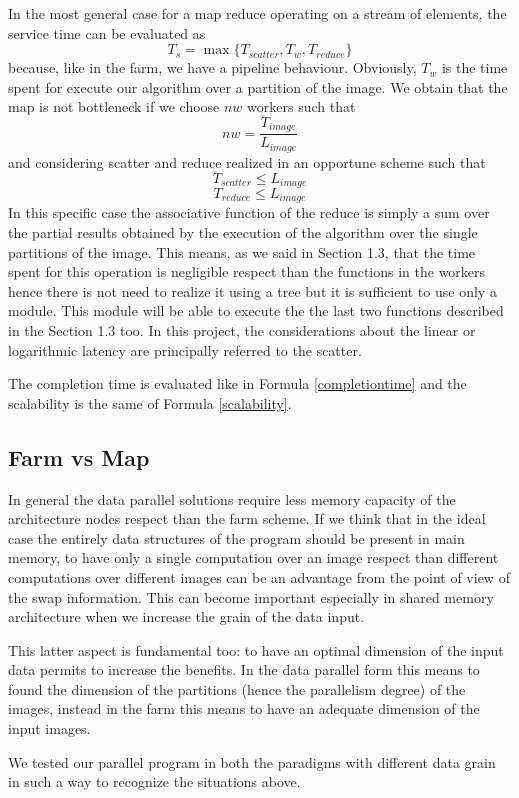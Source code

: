 In the most general case for a map reduce operating on a stream of elements, the service time can be evaluated as
\[
T_{s} = \max\lbrace T_{scatter}, T_{w}, T_{reduce}\rbrace
\]
because, like in the farm, we have a pipeline behaviour. Obviously, $T_{w}$ is the time spent for execute our algorithm over a partition of the image. We obtain that the map is not bottleneck if we choose $nw$ workers such that
\[
nw = \frac{T_{image}}{L_{image}}
\]
and considering scatter and reduce realized in an opportune scheme such that
\[
T_{scatter} \leq L_{image}
\]
\[
T_{reduce} \leq L_{image}
\] 
In this specific case the associative function of the reduce is simply a sum over the partial results obtained by the execution of the algorithm over the single partitions of the image. This means, as we said in Section 1.3, that the time spent for this operation is negligible respect than the functions in the workers hence there is not need to realize it using a tree but it is sufficient to use only a module. This module will be able to execute the the last two functions described in the Section 1.3 too. In this project, the considerations about the linear or logarithmic latency are principally referred to the scatter.

The completion time is evaluated like in Formula \ref{completiontime} and the scalability is the same of Formula \ref{scalability}.

\subsection{Farm vs Map}

In general the data parallel solutions require less memory capacity of the architecture nodes respect than the farm scheme. If we think that in the ideal case the entirely data structures of the program should be present in main memory, to have only a single computation over an image respect than different computations over different images can be an advantage from the point of view of the swap information. This can become important especially in shared memory architecture when we increase the grain of the data input.

This latter aspect is fundamental too: to have an optimal dimension of the input data permits to increase the benefits. In the data parallel form this means to found the dimension of the partitions (hence the parallelism degree) of the images, instead in the farm this means to have an adequate dimension of the input images.

We tested our parallel program in both the paradigms with different data grain in such a way to recognize the situations above.